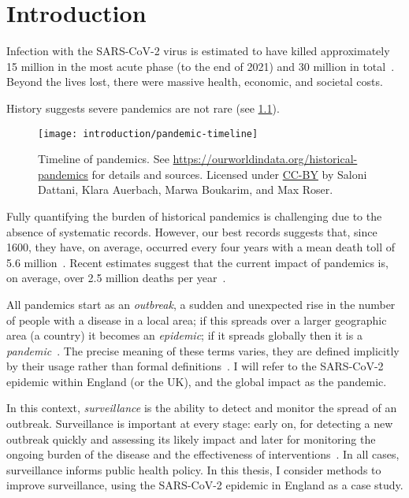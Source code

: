 \documentclass[thesis.tex]{subfiles}
\begin{document}
\chapter{Introduction} \label{intro}

Infection with the SARS-CoV-2 virus is estimated to have killed approximately 15 million in the most acute phase (to the end of 2021) and 30 million in total~\autocite{whoCOVIDExcess,economistCOVIDExcess}.
Beyond the lives lost, there were massive health, economic, and societal costs.

History suggests severe pandemics are not rare (see \cref{intro:fig:pandemic-timeline}).
\begin{figure}
    \texttt{[image: introduction/pandemic-timeline]}
    \caption[Timeline of pandemics.]{%
        Timeline of pandemics.
        See \url{https://ourworldindata.org/historical-pandemics} for details and sources.
        Licensed under \href{https://creativecommons.org/licenses/by/4.0/}{CC-BY} by Saloni Dattani, Klara Auerbach, Marwa Boukarim, and Max Roser.
    }
    \label{intro:fig:pandemic-timeline}
\end{figure}
Fully quantifying the burden of historical pandemics is challenging due to the absence of systematic records.
However, our best records suggests that, since 1600, they have, on average, occurred every four years with a mean death toll of 5.6 million~\autocite{maraniNovelEpidemics}.
Recent estimates suggest that the current impact of pandemics is, on average, over 2.5 million deaths per year~\autocite{madhavPandemicMortality}.

All pandemics start as an \emph{outbreak}, a sudden and unexpected rise in the number of people with a disease in a local area; if this spreads over a larger geographic area (\eg a country) it becomes an \emph{epidemic}; if it spreads globally then it is a \emph{pandemic}~\autocite{grennanPandemic}.
The precise meaning of these terms varies, they are defined implicitly by their usage rather than formal definitions~\autocite{morensPandemic,doshiElusive}.
I will refer to the SARS-CoV-2 epidemic within England (or the UK), and the global impact as the pandemic.

In this context, \emph{surveillance} is the ability to detect and monitor the spread of an outbreak.
Surveillance is important at every stage: early on, for detecting a new outbreak quickly and assessing its likely impact and later for monitoring the ongoing burden of the disease and the effectiveness of interventions~\autocite{whoFluSurveillance}.
In all cases, surveillance informs public health policy.
In this thesis, I consider methods to improve surveillance, using the SARS-CoV-2 epidemic in England as a case study.
\end{document}
